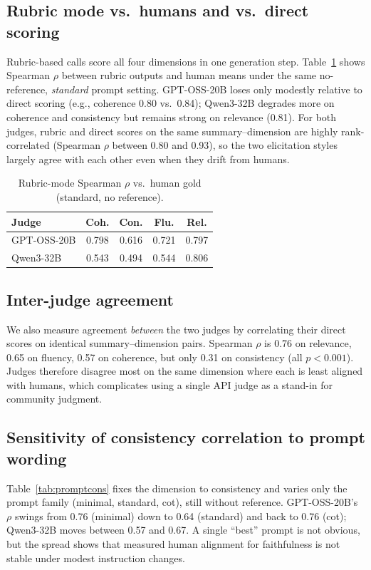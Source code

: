 \documentclass[11pt]{article}
\begin{document}
\subsection{Rubric mode vs.\ humans and vs.\ direct scoring}
Rubric-based calls score all four dimensions in one generation step. Table~\ref{tab:rubric} shows Spearman $\rho$ between rubric outputs and human means under the same no-reference, \emph{standard} prompt setting. GPT-OSS-20B loses only modestly relative to direct scoring (e.g., coherence 0.80 vs.\ 0.84); Qwen3-32B degrades more on coherence and consistency but remains strong on relevance (0.81). For both judges, rubric and direct scores on the same summary--dimension are highly rank-correlated (Spearman $\rho$ between 0.80 and 0.93), so the two elicitation styles largely agree with each other even when they drift from humans.

\begin{table}[t]
\centering
\footnotesize
\begin{tabular}{@{}lcccc@{}}
\toprule
Judge & Coh. & Con. & Flu. & Rel. \\
\midrule
GPT-OSS-20B & 0.798 & 0.616 & 0.721 & 0.797 \\
Qwen3-32B & 0.543 & 0.494 & 0.544 & 0.806 \\
\bottomrule
\end{tabular}
\caption{Rubric-mode Spearman $\rho$ vs.\ human gold (standard, no reference).}
\label{tab:rubric}
\end{table}

\subsection{Inter-judge agreement}
We also measure agreement \emph{between} the two judges by correlating their direct scores on identical summary--dimension pairs. Spearman $\rho$ is 0.76 on relevance, 0.65 on fluency, 0.57 on coherence, but only 0.31 on consistency (all $p{<}0.001$). Judges therefore disagree most on the same dimension where each is least aligned with humans, which complicates using a single API judge as a stand-in for community judgment.

\subsection{Sensitivity of consistency correlation to prompt wording}
Table~\ref{tab:promptcons} fixes the dimension to consistency and varies only the prompt family (minimal, standard, cot), still without reference. GPT-OSS-20B's $\rho$ swings from 0.76 (minimal) down to 0.64 (standard) and back to 0.76 (cot); Qwen3-32B moves between 0.57 and 0.67. A single ``best'' prompt is not obvious, but the spread shows that measured human alignment for faithfulness is not stable under modest instruction changes.
\end{document}
